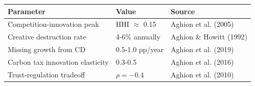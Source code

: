 \begin{tcolorbox}[colback=yellow!10!white, colframe=orange!75!black, title=Quick Reference: Key Aghion Parameters]
\begin{tabular}{lll}
\textbf{Parameter} & \textbf{Value} & \textbf{Source} \\
\hline
Competition-innovation peak & HHI $\approx$ 0.15 & Aghion et al. (2005) \\
Creative destruction rate & 4-6\% annually & Aghion \& Howitt (1992) \\
Missing growth from CD & 0.5-1.0 pp/year & Aghion et al. (2019) \\
Carbon tax innovation elasticity & 0.3-0.5 & Aghion et al. (2016) \\
Trust-regulation tradeoff & $\rho = -0.4$ & Aghion et al. (2010) \\
\end{tabular}
\end{tcolorbox}


